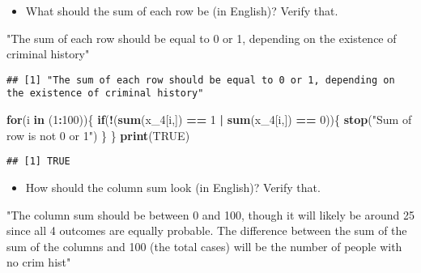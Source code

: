 \documentclass[]{article}
\newenvironment{Shaded}{\begin{snugshade}}{\end{snugshade}}
\newcommand{\KeywordTok}[1]{\textcolor[rgb]{0.13,0.29,0.53}{\textbf{#1}}}
\newcommand{\DecValTok}[1]{\textcolor[rgb]{0.00,0.00,0.81}{#1}}
\newcommand{\StringTok}[1]{\textcolor[rgb]{0.31,0.60,0.02}{#1}}
\newcommand{\OtherTok}[1]{\textcolor[rgb]{0.56,0.35,0.01}{#1}}
\newcommand{\ControlFlowTok}[1]{\textcolor[rgb]{0.13,0.29,0.53}{\textbf{#1}}}
\newcommand{\OperatorTok}[1]{\textcolor[rgb]{0.81,0.36,0.00}{\textbf{#1}}}
\newcommand{\NormalTok}[1]{#1}
\providecommand{\tightlist}{%
  \setlength{\itemsep}{0pt}\setlength{\parskip}{0pt}}
\begin{document}
\begin{itemize}
\tightlist
\item
  What should the sum of each row be (in English)? Verify that.
\end{itemize}

\begin{Shaded}
\begin{Highlighting}[]
\StringTok{"The sum of each row should be equal to 0 or 1, depending on the existence of criminal history"}
\end{Highlighting}
\end{Shaded}

\begin{verbatim}
## [1] "The sum of each row should be equal to 0 or 1, depending on the existence of criminal history"
\end{verbatim}

\begin{Shaded}
\begin{Highlighting}[]
  \ControlFlowTok{for}\NormalTok{(i }\ControlFlowTok{in}\NormalTok{ (}\DecValTok{1}\OperatorTok{:}\DecValTok{100}\NormalTok{))\{}
    \ControlFlowTok{if}\NormalTok{(}\OperatorTok{!}\NormalTok{(}\KeywordTok{sum}\NormalTok{(x_}\DecValTok{4}\NormalTok{[i,]) }\OperatorTok{==}\StringTok{ }\DecValTok{1} \OperatorTok{|}\StringTok{ }\KeywordTok{sum}\NormalTok{(x_}\DecValTok{4}\NormalTok{[i,]) }\OperatorTok{==}\StringTok{ }\DecValTok{0}\NormalTok{))\{}
        \KeywordTok{stop}\NormalTok{(}\StringTok{"Sum of row is not 0 or 1"}\NormalTok{)}
\NormalTok{    \}}
\NormalTok{  \}  }
  \KeywordTok{print}\NormalTok{(}\OtherTok{TRUE}\NormalTok{)}
\end{Highlighting}
\end{Shaded}

\begin{verbatim}
## [1] TRUE
\end{verbatim}

\begin{itemize}
\tightlist
\item
  How should the column sum look (in English)? Verify that.
\end{itemize}

\begin{Shaded}
\begin{Highlighting}[]
\StringTok{"The column sum should be between 0 and 100, though it will likely be around 25 since all 4 outcomes are equally probable. The difference between the sum of the sum of the columns and 100 (the total cases) will be the number of people with no crim hist"}
\end{Highlighting}
\end{Shaded}
\end{document}
